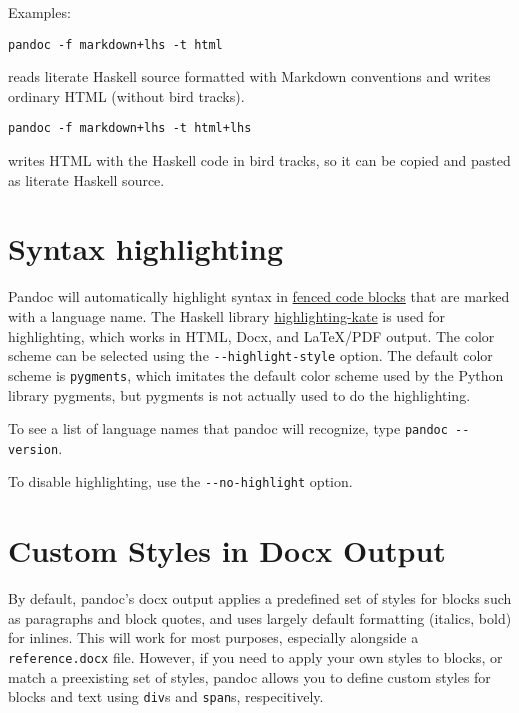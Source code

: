 \documentclass[]{article}
\begin{document}
Examples:

\begin{verbatim}
pandoc -f markdown+lhs -t html
\end{verbatim}

reads literate Haskell source formatted with Markdown conventions and
writes ordinary HTML (without bird tracks).

\begin{verbatim}
pandoc -f markdown+lhs -t html+lhs
\end{verbatim}

writes HTML with the Haskell code in bird tracks, so it can be copied
and pasted as literate Haskell source.

\hypertarget{syntax-highlighting}{\section{Syntax
highlighting}\label{syntax-highlighting}}

Pandoc will automatically highlight syntax in
\protect\hyperlink{fenced-code-blocks}{fenced code blocks} that are
marked with a language name. The Haskell library
\href{https://github.com/jgm/highlighting-kate}{highlighting-kate} is
used for highlighting, which works in HTML, Docx, and LaTeX/PDF output.
The color scheme can be selected using the \texttt{-\/-highlight-style}
option. The default color scheme is \texttt{pygments}, which imitates
the default color scheme used by the Python library pygments, but
pygments is not actually used to do the highlighting.

To see a list of language names that pandoc will recognize, type
\texttt{pandoc\ -\/-version}.

To disable highlighting, use the \texttt{-\/-no-highlight} option.

\section{Custom Styles in Docx
Output}\label{custom-styles-in-docx-output}

By default, pandoc's docx output applies a predefined set of styles for
blocks such as paragraphs and block quotes, and uses largely default
formatting (italics, bold) for inlines. This will work for most
purposes, especially alongside a \texttt{reference.docx} file. However,
if you need to apply your own styles to blocks, or match a preexisting
set of styles, pandoc allows you to define custom styles for blocks and
text using \texttt{div}s and \texttt{span}s, respecitively.
\end{document}
